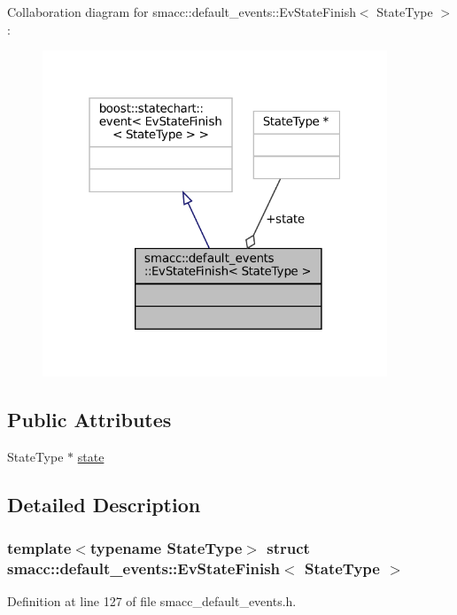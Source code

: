 Collaboration diagram for smacc\+:\+:default\+\_\+events\+:\+:Ev\+State\+Finish$<$ State\+Type $>$\+:
\nopagebreak
\begin{figure}[H]
\begin{center}
\leavevmode
\includegraphics[width=292pt]{structsmacc_1_1default__events_1_1EvStateFinish__coll__graph}
\end{center}
\end{figure}
\subsection*{Public Attributes}
\begin{DoxyCompactItemize}
\item 
State\+Type $\ast$ \hyperlink{structsmacc_1_1default__events_1_1EvStateFinish_ad598cccf2b8ddb507f3c0efba2232d62}{state}
\end{DoxyCompactItemize}


\subsection{Detailed Description}
\subsubsection*{template$<$typename State\+Type$>$\newline
struct smacc\+::default\+\_\+events\+::\+Ev\+State\+Finish$<$ State\+Type $>$}



Definition at line 127 of file smacc\+\_\+default\+\_\+events.\+h.



